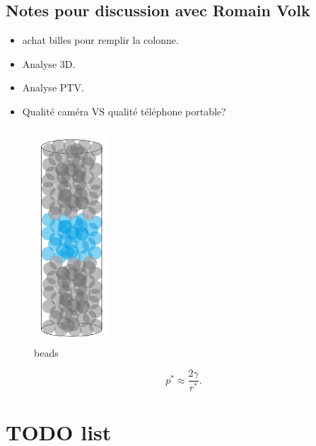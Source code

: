 \documentclass[twocolumn,amsmath,amssymb,floatfix]{revtex4}
\begin{document}
\subsection{Notes pour discussion avec Romain Volk}

\begin{itemize}
    \item achat billes pour remplir la colonne.
    \item Analyse 3D.
    \item Analyse PTV.
    \item Qualité caméra VS qualité téléphone portable?
\end{itemize}


\begin{figure}
\includegraphics[height=8cm]{figures/beadsStack.png}
\caption{beads}
\label{fig:beads}
\end{figure}


% 
% 
\begin{equation}
p^{*}\approx \frac{2\gamma}{r^{*}}.\label{eq:ppit}
\end{equation}

\section{TODO list}
\end{document}

